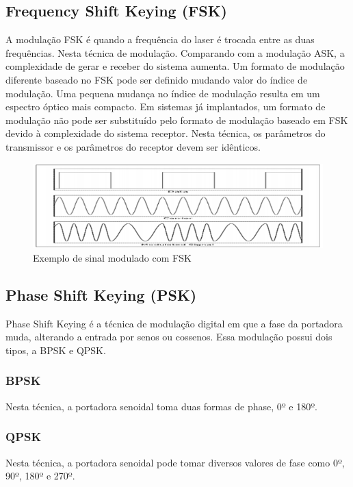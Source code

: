 \documentclass[article]{IEEEtran}
\begin{document}
\subsection{Frequency Shift Keying (FSK)}
\par A modulação FSK é quando a frequência do laser é trocada entre as duas frequências. Nesta técnica de modulação. Comparando com a modulação ASK, a complexidade de gerar e receber do sistema aumenta. Um formato de modulação diferente baseado no FSK pode ser definido mudando valor do índice de modulação. Uma pequena mudança no índice de modulação resulta em um espectro óptico mais compacto. Em sistemas já implantados, um formato de modulação não pode ser substituído pelo formato de modulação baseado em FSK devido à complexidade do sistema receptor. Nesta técnica, os parâmetros do transmissor e os  parâmetros do receptor devem ser idênticos.\cite{MODULATION}

\begin{figure}[hb]
\includegraphics[width=\columnwidth]{fsk.png}
\caption{Exemplo de sinal modulado com FSK}
\end{figure}

\subsection{Phase Shift Keying (PSK)}
\par Phase Shift Keying é a técnica de modulação digital em que a fase da portadora muda, alterando a entrada por senos ou cossenos. Essa modulação possui  dois tipos, a BPSK e QPSK.
\subsubsection{BPSK}
\par Nesta técnica, a portadora senoidal toma duas formas de phase, 0º e 180º.
\subsubsection{QPSK}
\par Nesta técnica, a portadora senoidal pode tomar diversos valores de fase como 0º, 90º, 180º e 270º.
\end{document}
